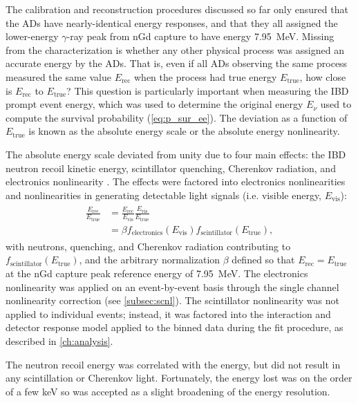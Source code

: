 The calibration and reconstruction procedures discussed so far
only ensured that the ADs have nearly-identical energy responses,
and that they all assigned the lower-energy $\gamma$-ray peak from nGd capture
to have energy \SI{7.95}{\MeV}.
Missing from the characterization is whether any other physical process
was assigned an accurate energy by the ADs.
That is, even if all ADs observing the same process
measured the same value $E_{\text{rec}}$
when the process had true energy $E_{\text{true}}$,
how close is $E_{\text{rec}}$ to $E_{\text{true}}$?
This question is particularly important when measuring the IBD prompt event energy,
which was used to determine the original \nuebar{} energy $E_\nu$
used to compute the survival probability (\cref{eq:p_sur_ee}).
The deviation as a function of $E_{\text{true}}$ is known as
the absolute energy scale or the absolute energy nonlinearity.

The absolute energy scale deviated from unity due to four main effects:
the IBD neutron recoil kinetic energy, scintillator quenching,
Cherenkov radiation, and electronics nonlinearity \cite{ngd2016}.
The effects were factored into electronics nonlinearities
and nonlinearities in generating detectable light signals
(i.e. visible energy, $E_{\text{vis}}$):
\begin{align}
    \begin{split}
        \frac{E_{\text{rec}}}{E_{\text{true}}}
        &=
        \frac{E_{\text{rec}}}{E_{\text{vis}}}
        \frac{E_{\text{vis}}}{E_{\text{true}}} \\
        &= \beta f_{\text{electronics}}(E_{\text{vis}})
        f_{\text{scintillator}}(E_{\text{true}}),
    \end{split}
\end{align}
with neutrons, quenching, and Cherenkov radiation contributing to
$f_{\text{scintillator}}(E_{\text{true}})$,
and the arbitrary normalization $\beta$ defined so that
$E_{\text{rec}} = E_{\text{true}}$
at the nGd capture peak reference energy of \SI{7.95}{\MeV}.
The electronics nonlinearity was applied on an event-by-event basis
through the single channel nonlinearity correction (see \cref{subsec:scnl}).
The scintillator nonlinearity was not applied to individual events;
instead, it was factored into the interaction and detector response model
applied to the binned data during the \thetaot{} fit procedure,
as described in \cref{ch:analysis}.

The neutron recoil energy was correlated with the \nuebar{} energy,
but did not result in any scintillation or Cherenkov light.
Fortunately, the energy lost was on the order of a few \si{\keV}
so was accepted as a slight broadening of the energy resolution.

